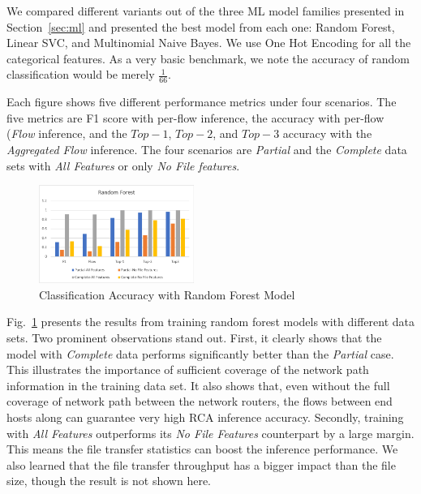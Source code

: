 We compared different variants out of the three ML model families presented in Section~\ref{sec:ml} and presented the best model from each one: Random Forest, Linear SVC, and Multinomial Naive Bayes.
We use One Hot Encoding for all the categorical features. As a very basic benchmark, we note the accuracy of random classification would be merely $\frac{1}{66}$. 

Each figure shows five different performance metrics under four scenarios. The five metrics are F1 score with per-flow inference, the accuracy with per-flow ({\it Flow} inference, and the $Top-1$, $Top-2$, and $Top-3$ accuracy with
the {\it Aggregated Flow} inference. The four scenarios are {\it Partial} and the {\it Complete} data sets with {\it All Features} or only {\it No File features}.

\begin{figure}[!ht]
\begin{center}
\includegraphics[width=0.45\textwidth]{./figure/rf-accuracy}
\end{center}
\caption{Classification Accuracy with Random Forest Model}
\label{fig:dt}
\end{figure}

Fig.~\ref{fig:dt} presents the results from training random forest models with different data sets. Two prominent observations stand out. 
First, it clearly shows that the model with {\it Complete} data performs significantly better than the {\it Partial} case. This illustrates the importance of sufficient 
coverage of the network path information in the training data set. It also shows that, even without the full coverage of network path between the network routers, 
the flows between end hosts along can guarantee very high RCA inference accuracy.   
Secondly, training with {\it All Features} outperforms its {\it No File Features} counterpart by a large margin. This means the file transfer statistics can boost the inference performance.  
We also learned that the file transfer throughput has a bigger impact than the file size, though the result is not shown here. 

